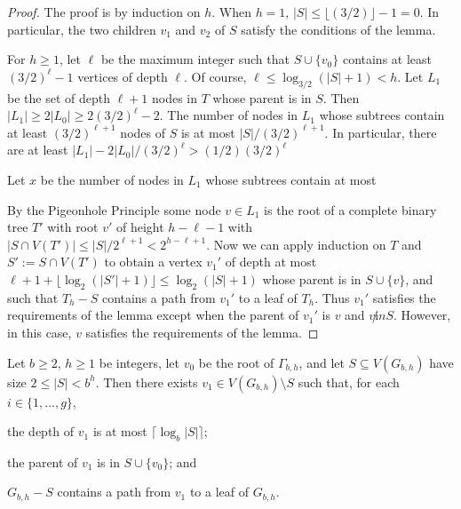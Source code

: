 \documentclass{patmorin}
\begin{document}
\begin{proof}
  The proof is by induction on $h$.  When $h=1$, $|S|\le\lfloor (3/2)\rfloor-1=0$. In particular, the two children $v_1$ and $v_2$ of $S$ satisfy the conditions of the lemma.

  For $h\ge 1$, let $\ell$ be the maximum integer such that $S\cup\{v_0\}$ contains at least $(3/2)^\ell-1$ vertices of depth $\ell$.  Of course, $\ell \le \log_{3/2}(|S|+1) < h$.  Let $L_1$ be the set of depth $\ell+1$ nodes in $T$ whose parent is in $S$.  Then $|L_1|\ge 2|L_0| \ge 2(3/2)^\ell - 2$.  The number of nodes in $L_1$ whose subtrees contain at least $(3/2)^{\ell+1}$ nodes of $S$ is at most $|S|/(3/2)^{\ell+1}$.  In particular, there are at least $|L_1|- 2|L_0|/(3/2)^{\ell} > (1/2)(3/2)^\ell$



  Let $x$ be the number of nodes in $L_1$ whose subtrees contain at most 



  By the Pigeonhole Principle some node $v\in L_1$ is the root of a complete binary tree $T'$ with root $v'$ of height $h-\ell-1$ with $|S\cap V(T')| \le |S|/2^{\ell+1} < 2^{h-\ell+1}$.  Now we can apply induction on $T$ and $S':=S\cap V(T')$ to obtain a vertex $v_1'$ of depth at most $\ell+1+\lfloor \log_2(|S'|+1)\rfloor \le \log_2(|S|+1)$ whose parent is in $S\cup\{v\}$, and such that $T_h-S$ contains a path from $v_1'$ to a leaf of $T_h$.  Thus $v_1'$ satisfies the requirements of the lemma except when the parent of $v_1'$ is $v$ and $v\not in S$.  However, in this case, $v$ satisfies the requirements of the lemma.
\end{proof}




\begin{lem}\label{one_path}
  Let $b\ge 2$, $h\ge 1$ be integers, let $v_0$ be the root of $\Gamma_{b,h}$, and let $S\subseteq V(G_{b,h})$ have size $2\le |S| < b^h$.  Then there exists $v_1\in V(G_{b,h})\setminus S$ such that, for each $i\in\{1,\ldots,g\}$, 
  \begin{compactenum}[(i)]
    \item the depth of $v_1$ is at most $\lceil \log_b|S|\rceil$;
    \item the parent of $v_1$ is in $S\cup\{v_0\}$; and
    \item $G_{b,h}-S$ contains a path from $v_1$ to a leaf of $G_{b,h}$.
  \end{compactenum} 
\end{lem}
\end{document}
